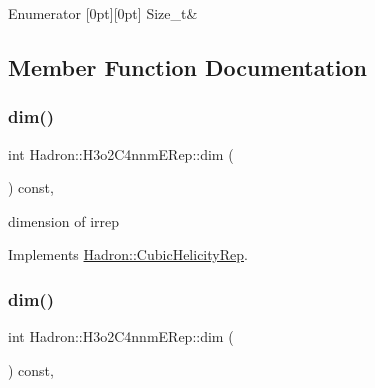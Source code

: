 \begin{DoxyEnumFields}{Enumerator}
[0pt][0pt]{}\mbox{\label{structHadron_1_1H3o2C4nnmERep_ae93978abab9bd88dc8f5589d4ede42ceabafec3f3d860668abf17d8cbb6d1899c}} 
Size\+\_\+t&\\
\hline

\end{DoxyEnumFields}


\subsection{Member Function Documentation}
\mbox{\label{structHadron_1_1H3o2C4nnmERep_a8033496b62e24970283fce0c10203e0c}} 
\subsubsection{\texorpdfstring{dim()}{dim()}\hspace{0.1cm}{\footnotesize\ttfamily [1/3]}}
{\footnotesize\ttfamily int Hadron\+::\+H3o2\+C4nnm\+E\+Rep\+::dim (\begin{DoxyParamCaption}{ }\end{DoxyParamCaption}) const\hspace{0.3cm}{\ttfamily [inline]}, {\ttfamily [virtual]}}

dimension of irrep 

Implements \mbox{\hyperlink{structHadron_1_1CubicHelicityRep_a95d229a05580e65f8bdde74a1e316855}{Hadron\+::\+Cubic\+Helicity\+Rep}}.

\mbox{\label{structHadron_1_1H3o2C4nnmERep_a8033496b62e24970283fce0c10203e0c}} 
\subsubsection{\texorpdfstring{dim()}{dim()}\hspace{0.1cm}{\footnotesize\ttfamily [2/3]}}
{\footnotesize\ttfamily int Hadron\+::\+H3o2\+C4nnm\+E\+Rep\+::dim (\begin{DoxyParamCaption}{ }\end{DoxyParamCaption}) const\hspace{0.3cm}{\ttfamily [inline]}, {\ttfamily [virtual]}}

